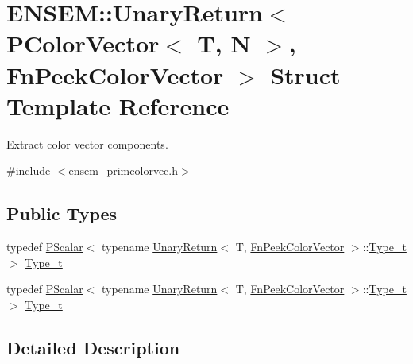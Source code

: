 \hypertarget{structENSEM_1_1UnaryReturn_3_01PColorVector_3_01T_00_01N_01_4_00_01FnPeekColorVector_01_4}{}\section{E\+N\+S\+EM\+:\+:Unary\+Return$<$ P\+Color\+Vector$<$ T, N $>$, Fn\+Peek\+Color\+Vector $>$ Struct Template Reference}
\label{structENSEM_1_1UnaryReturn_3_01PColorVector_3_01T_00_01N_01_4_00_01FnPeekColorVector_01_4}


Extract color vector components.  




{\ttfamily \#include $<$ensem\+\_\+primcolorvec.\+h$>$}

\subsection*{Public Types}
\begin{DoxyCompactItemize}
\item 
typedef \mbox{\hyperlink{classENSEM_1_1PScalar}{P\+Scalar}}$<$ typename \mbox{\hyperlink{structENSEM_1_1UnaryReturn}{Unary\+Return}}$<$ T, \mbox{\hyperlink{structENSEM_1_1FnPeekColorVector}{Fn\+Peek\+Color\+Vector}} $>$\+::\mbox{\hyperlink{structENSEM_1_1UnaryReturn_3_01PColorVector_3_01T_00_01N_01_4_00_01FnPeekColorVector_01_4_a827d146f0d51b63a38339bc9218d64d4}{Type\+\_\+t}} $>$ \mbox{\hyperlink{structENSEM_1_1UnaryReturn_3_01PColorVector_3_01T_00_01N_01_4_00_01FnPeekColorVector_01_4_a827d146f0d51b63a38339bc9218d64d4}{Type\+\_\+t}}
\item 
typedef \mbox{\hyperlink{classENSEM_1_1PScalar}{P\+Scalar}}$<$ typename \mbox{\hyperlink{structENSEM_1_1UnaryReturn}{Unary\+Return}}$<$ T, \mbox{\hyperlink{structENSEM_1_1FnPeekColorVector}{Fn\+Peek\+Color\+Vector}} $>$\+::\mbox{\hyperlink{structENSEM_1_1UnaryReturn_3_01PColorVector_3_01T_00_01N_01_4_00_01FnPeekColorVector_01_4_a827d146f0d51b63a38339bc9218d64d4}{Type\+\_\+t}} $>$ \mbox{\hyperlink{structENSEM_1_1UnaryReturn_3_01PColorVector_3_01T_00_01N_01_4_00_01FnPeekColorVector_01_4_a827d146f0d51b63a38339bc9218d64d4}{Type\+\_\+t}}
\end{DoxyCompactItemize}


\subsection{Detailed Description}
